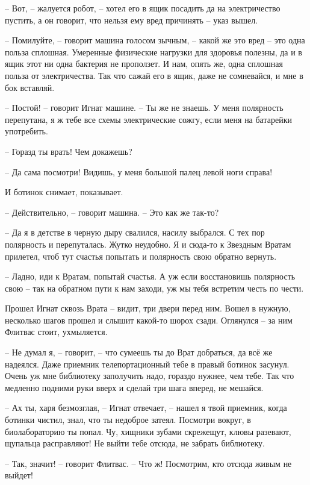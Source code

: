 \documentclass[ebook,oneside,final,openright]{memoir}
\begin{document}
– Вот, – жалуется робот, – хотел его в ящик посадить да на электричество пустить, а он говорит, что нельзя ему вред причинять – указ вышел. \par
– Помилуйте, – говорит машина голосом зычным, – какой же это вред – это одна польза сплошная. Умеренные физические нагрузки для здоровья полезны, да и в ящик этот ни одна бактерия не проползет. И нам, опять же, одна сплошная польза от электричества. Так что сажай его в ящик, даже не сомневайся, и мне в бок вставляй. \par
– Постой! – говорит Игнат машине. – Ты же не знаешь. У меня полярность перепутана, я ж тебе все схемы электрические сожгу, если меня на батарейки употребить. \par
– Горазд ты врать! Чем докажешь? \par
– Да сама посмотри! Видишь, у меня большой палец левой ноги справа! \par
И ботинок снимает, показывает. \par
– Действительно, – говорит машина. – Это как же так-то? \par
– Да я в детстве в черную дыру свалился, насилу выбрался. С тех пор полярность и перепуталась. Жутко неудобно. Я и сюда-то к Звездным Вратам прилетел, чтоб тут счастья попытать и полярность свою обратно вернуть. \par
– Ладно, иди к Вратам, попытай счастья. А уж если восстановишь полярность свою – так на обратном пути к нам заходи, уж мы тебя встретим честь по чести.\par
\par
Прошел Игнат сквозь Врата – видит, три двери перед ним. Вошел в нужную, несколько шагов прошел и слышит какой-то шорох сзади. Оглянулся – за ним Флитвас стоит, ухмыляется. \par
\par
– Не думал я, – говорит, – что сумеешь ты до Врат добраться, да всё же надеялся. Даже приемник телепортационный тебе в правый ботинок засунул. Очень уж мне библиотеку заполучить надо, гораздо нужнее, чем тебе. Так что медленно подними руки вверх и сделай три шага вперед, не мешайся.\par
– Ах ты, харя безмозглая, – Игнат отвечает, – нашел я твой приемник, когда ботинки чистил, знал, что ты недоброе затеял. Посмотри вокруг, в биолабораторию ты попал. Чу, хищники зубами скрежещут, клювы разевают, щупальца расправляют! Не выйти тебе отсюда, не забрать библиотеку.\par
– Так, значит! – говорит Флитвас. – Что ж! Посмотрим, кто отсюда живым не выйдет!\par
\end{document}
